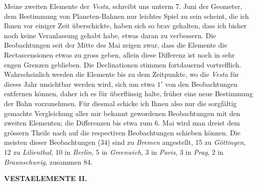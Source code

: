 \par\indent Meine zweiten Elemente der \emph{Vesta}, schreibt uns unterm 7. Juni der Geometer, dem Bestimmung von Planeten-Bahnen nur leichtes Spiel zu sein scheint, die ich Ihnen vor einiger Zeit überschickte, haben sich so brav gehalten, dass ich bisher noch keine Veranlassung gehabt habe, etwas daran zu verbessern. Die Beobachtungen seit der Mitte des Mai zeigen zwar, dass die Elemente die Rectascensionen etwas zu gross geben, allein diese Differenz ist noch in sehr engen Grenzen geblieben. Die Declinationen stimmen fortdauernd vortrefflich. Wahrscheinlich werden die Elemente bis zu dem Zeitpunkte, wo die \emph{Vesta} für dieses Jahr unsichtbar werden wird, sich um etwa $1'$ von den Beobachtungen entfernen können, daher ich es für überflüssig halte, früher eine neue Bestimmung der Bahn vorzunehmen. Für diesmal schicke ich Ihnen also nur die sorgfältig gemachte Vergleichung aller mir bekannt gewordenen Beobachtungen mit den zweiten Elementen; die Differenzen bis etwa zum 6. Mai wird man dreist dem grössern Theile nach auf die respectiven Beobachtungen schieben können. Die meisten dieser Beobachtungen (34) sind zu \emph{Bremen} angestellt, 15 zu \emph{Göttingen}, 12 zu \emph{Lilienthal}, 10 in \emph{Berlin}, 5 in \emph{Greenwich}, 3 in \emph{Paris}, 3 in \emph{Prag}, 2 in \emph{Braunschweig}, zusammen 84.
\par\clearpage
\thispagestyle{empty}
\noindent{}%
\makebox[12mm][l]{}%
\parbox[t]{\dimexpr\linewidth-24mm\relax}{\centering\footnotesize\bfseries VESTA\quad ELEMENTE II.\par}%
\par\nobreak\medskip
\begingroup
\fontsize{9}{11}\selectfont
\setlength{\tabcolsep}{2.5pt}\renewcommand{\arraystretch}{1.10}
